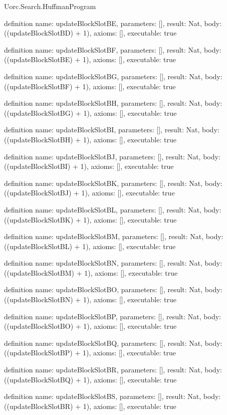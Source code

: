 \begin{lexlean}{Uorc.Search.HuffmanProgram}
\begin{semanticmodule}
definition{
  name: updateBlockSlotBE,
  parameters: [],
  result: Nat,
  body: ((updateBlockSlotBD) + 1),
  axioms: [],
  executable: true
}

definition{
  name: updateBlockSlotBF,
  parameters: [],
  result: Nat,
  body: ((updateBlockSlotBE) + 1),
  axioms: [],
  executable: true
}

definition{
  name: updateBlockSlotBG,
  parameters: [],
  result: Nat,
  body: ((updateBlockSlotBF) + 1),
  axioms: [],
  executable: true
}

definition{
  name: updateBlockSlotBH,
  parameters: [],
  result: Nat,
  body: ((updateBlockSlotBG) + 1),
  axioms: [],
  executable: true
}

definition{
  name: updateBlockSlotBI,
  parameters: [],
  result: Nat,
  body: ((updateBlockSlotBH) + 1),
  axioms: [],
  executable: true
}

definition{
  name: updateBlockSlotBJ,
  parameters: [],
  result: Nat,
  body: ((updateBlockSlotBI) + 1),
  axioms: [],
  executable: true
}

definition{
  name: updateBlockSlotBK,
  parameters: [],
  result: Nat,
  body: ((updateBlockSlotBJ) + 1),
  axioms: [],
  executable: true
}

definition{
  name: updateBlockSlotBL,
  parameters: [],
  result: Nat,
  body: ((updateBlockSlotBK) + 1),
  axioms: [],
  executable: true
}

definition{
  name: updateBlockSlotBM,
  parameters: [],
  result: Nat,
  body: ((updateBlockSlotBL) + 1),
  axioms: [],
  executable: true
}

definition{
  name: updateBlockSlotBN,
  parameters: [],
  result: Nat,
  body: ((updateBlockSlotBM) + 1),
  axioms: [],
  executable: true
}

definition{
  name: updateBlockSlotBO,
  parameters: [],
  result: Nat,
  body: ((updateBlockSlotBN) + 1),
  axioms: [],
  executable: true
}

definition{
  name: updateBlockSlotBP,
  parameters: [],
  result: Nat,
  body: ((updateBlockSlotBO) + 1),
  axioms: [],
  executable: true
}

definition{
  name: updateBlockSlotBQ,
  parameters: [],
  result: Nat,
  body: ((updateBlockSlotBP) + 1),
  axioms: [],
  executable: true
}

definition{
  name: updateBlockSlotBR,
  parameters: [],
  result: Nat,
  body: ((updateBlockSlotBQ) + 1),
  axioms: [],
  executable: true
}

definition{
  name: updateBlockSlotBS,
  parameters: [],
  result: Nat,
  body: ((updateBlockSlotBR) + 1),
  axioms: [],
  executable: true
}


\end{semanticmodule}
\end{lexlean}
